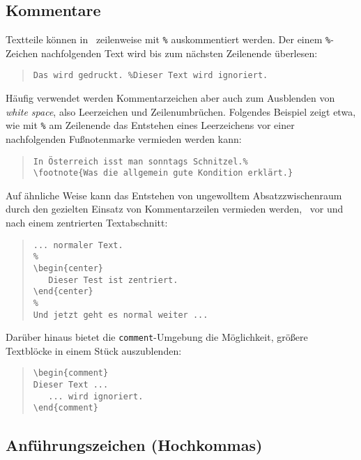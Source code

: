 \subsection{Kommentare}
\label{sec:kommentare}


Textteile können in \latex\ zeilenweise mit \verb!%! auskommentiert werden. Der einem 
\verb!%!-Zeichen nachfolgenden Text wird bis zum nächsten Zeilenende überlesen:
%
\begin{quote}
\verb!Das wird gedruckt. %Dieser Text wird ignoriert.!
\end{quote}
%
Häufig verwendet werden Kommentarzeichen aber auch zum Ausblenden von 
\emph{white space}, also Leerzeichen und Zeilenumbrüchen.
Folgendes Beispiel zeigt etwa, wie mit \verb!%! am Zeilenende das Entstehen
eines Leerzeichens vor einer nachfolgenden Fußnotenmarke vermieden werden kann:
%
\begin{quote}
\begin{verbatim}
In Österreich isst man sonntags Schnitzel.%
\footnote{Was die allgemein gute Kondition erklärt.}
\end{verbatim}
\end{quote}
%

\begin{sloppypar}
\noindent
Auf ähnliche Weise kann das Entstehen von ungewolltem Absatzzwischenraum durch 
den gezielten Einsatz von Kommentarzeilen vermieden werden, \zB\ vor und nach einem zentrierten
Textabschnitt:
\end{sloppypar}
%
\begin{quote}
\begin{verbatim}
... normaler Text.
%
\begin{center}
   Dieser Test ist zentriert.
\end{center}
%
Und jetzt geht es normal weiter ...
\end{verbatim}
\end{quote}
%
Darüber hinaus bietet die \verb!comment!-Umgebung die Möglichkeit, größere Text\-blöcke
in einem Stück auszublenden:
%
\begin{quote}
\begin{verbatim}
\begin{comment}
Dieser Text ...
   ... wird ignoriert.
\end{comment}
\end{verbatim}
\end{quote}




\subsection{Anführungszeichen (Hochkommas)}
\label{sec:anfuehrungszeichen}

